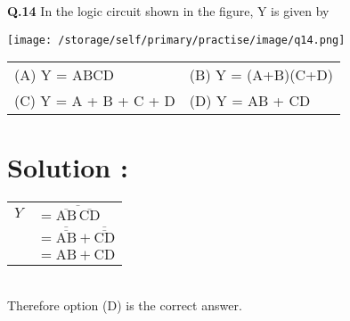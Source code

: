 \documentclass{article} %
\begin{document}
\vspace*{2em}
\textbf{Q.14 } In the logic circuit shown in the figure, Y is given by\\
\begin{center}
\vspace{0.5cm}
\texttt{[image: /storage/self/primary/practise/image/q14.png]}
\vspace{0.5cm}

\end{center}

\begin{tabular}{ll}
(A) Y = ABCD       & (B) Y = (A+B)(C+D)\\
(C) Y = A + B + C + D  &  (D) Y = AB + CD \\



\end{tabular}


\section*{Solution :}
\begin{tabular}{ll}
  $Y $ &  $ = \overline{{\overline{  {\text{AB}}}\,\overline{  {\text{CD}}}}}      $
\\
$  $ & $ = \overline{  {\overline{  {\text{AB}}}}} + \overline{  {\overline{  {\text{CD}}}}}    $
\\
 $  $ & $ = \text{AB} + \text{CD}    $
\\
\end{tabular}
\\

Therefore option (D) is the correct answer.
\end{document}
